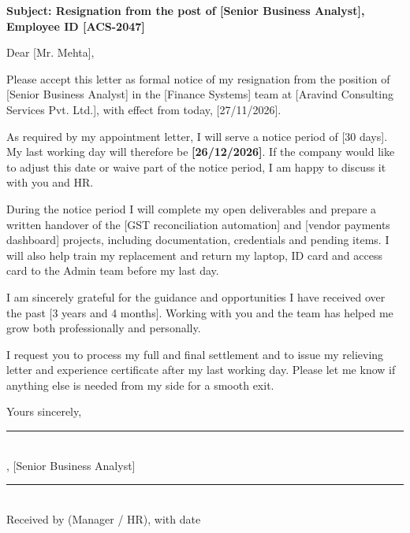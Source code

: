 \documentclass[10pt]{article}
\begin{document}
\textbf{Subject: Resignation from the post of [Senior Business Analyst], Employee ID [ACS-2047]}\par\vspace{4pt}

Dear [Mr. Mehta],\par\vspace{4pt}

Please accept this letter as formal notice of my resignation from the position of [Senior Business Analyst] in the [Finance Systems] team at [Aravind Consulting Services Pvt. Ltd.], with effect from today, [27/11/2026].\par\vspace{4pt}

As required by my appointment letter, I will serve a notice period of [30 days]. My last working day will therefore be \textbf{[26/12/2026]}. If the company would like to adjust this date or waive part of the notice period, I am happy to discuss it with you and HR.\par\vspace{4pt}

During the notice period I will complete my open deliverables and prepare a written handover of the [GST reconciliation automation] and [vendor payments dashboard] projects, including documentation, credentials and pending items. I will also help train my replacement and return my laptop, ID card and access card to the Admin team before my last day.\par\vspace{4pt}

I am sincerely grateful for the guidance and opportunities I have received over the past [3 years and 4 months]. Working with you and the team has helped me grow both professionally and personally.\par\vspace{4pt}

I request you to process my full and final settlement and to issue my relieving letter and experience certificate after my last working day. Please let me know if anything else is needed from my side for a smooth exit.\par\vspace{4pt}

Yours sincerely,\par\vspace{4pt}

\vspace{32pt}\noindent\parbox[t]{0.3\linewidth}{\centering\rule{\linewidth}{0.5pt}\\ [Priya Nair], [Senior Business Analyst]}\hfill\parbox[t]{0.3\linewidth}{\centering\rule{\linewidth}{0.5pt}\\ Received by (Manager / HR), with date}\par
\end{document}
